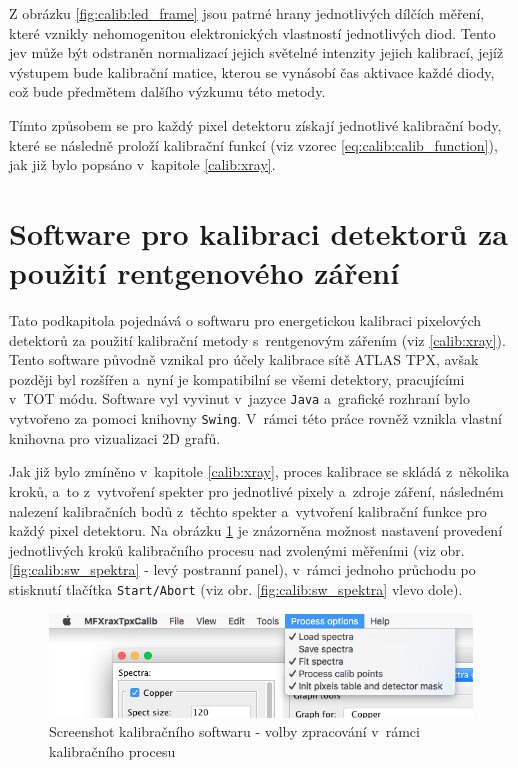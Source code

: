 Z obrázku \ref{fig:calib:led_frame} jsou patrné hrany jednotlivých dílčích měření, které vznikly nehomogenitou elektronických vlastností jednotlivých diod. Tento jev může být odstraněn normalizací jejich světelné intenzity jejich kalibrací, jejíž výstupem bude kalibrační matice, kterou se vynásobí čas aktivace každé diody, což bude předmětem dalšího výzkumu této metody.

Tímto způsobem se pro každý pixel detektoru získají jednotlivé kalibrační body, které se následně proloží kalibrační funkcí (viz vzorec \ref{eq:calib:calib_function}), jak již bylo popsáno v~kapitole \ref{calib:xray}.


\section{Software pro kalibraci detektorů za použití rentgenového záření}\label{calib:sw}

Tato podkapitola pojednává o softwaru pro energetickou kalibraci pixelových detektorů za použití kalibrační metody s~rentgenovým zářením (viz \ref{calib:xray}). Tento software původně vznikal pro účely kalibrace sítě ATLAS TPX, avšak později byl rozšířen a~nyní je kompatibilní se všemi detektory, pracujícími v~TOT módu. Software vyl vyvinut v~jazyce \texttt{Java} a~grafické rozhraní bylo vytvořeno za pomoci knihovny \texttt{Swing}. V~rámci této práce rovněž vznikla vlastní knihovna pro vizualizaci 2D grafů.

Jak již bylo zmíněno v~kapitole \ref{calib:xray}, proces kalibrace se skládá z~několika kroků, a~to z~vytvoření spekter pro jednotlivé pixely a~zdroje záření, následném nalezení kalibračních bodů z~těchto spekter a~vytvoření kalibrační funkce pro každý pixel detektoru. Na obrázku \ref{fig:calib:sw_process_ops} je znázorněna možnost nastavení provedení jednotlivých kroků kalibračního procesu nad zvolenými měřeními (viz obr. \ref{fig:calib:sw_spektra} - levý postranní panel), v~rámci jednoho průchodu po stisknutí tlačítka \texttt{Start/Abort} (viz obr. \ref{fig:calib:sw_spektra} vlevo dole).

\begin{figure}[th]
	\begin{center}
		\includegraphics[width=14cm]{figures/calibsw_process_ops.png}
		\caption{Screenshot kalibračního softwaru - volby zpracování v~rámci kalibračního procesu}
		\label{fig:calib:sw_process_ops}
	\end{center}
\end{figure}


